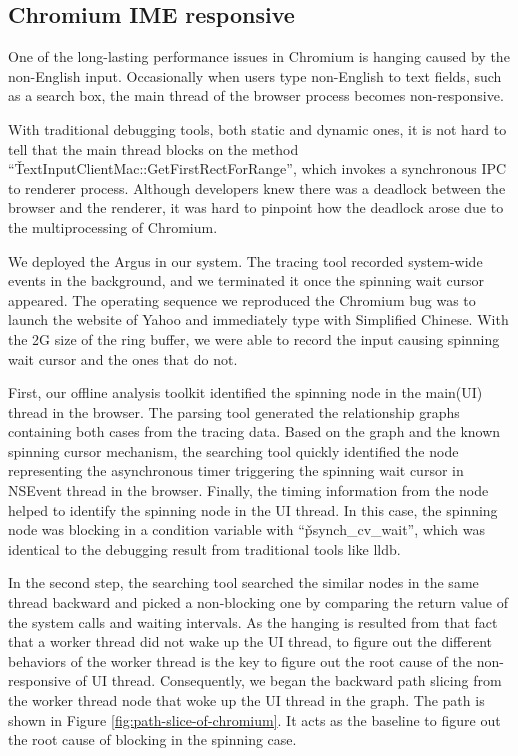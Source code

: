 \subsection{Chromium IME responsive}
One of the long-lasting performance issues in Chromium is hanging caused by the non-English input.
Occasionally when users type non-English to text fields, such as a search box, the main thread of the browser process becomes non-responsive.
 
With traditional debugging tools, both static and dynamic ones, it is not hard to tell that the main thread blocks on the method ``\v{TextInputClientMac::GetFirstRectForRange}'', which invokes a synchronous IPC to renderer process.
Although developers knew there was a deadlock between the browser and the renderer,
it was hard to pinpoint how the deadlock arose due to the multiprocessing of Chromium.

We deployed the Argus in our system. 
The tracing tool recorded system-wide events in the background, and we terminated it once the spinning wait cursor appeared.
The operating sequence we reproduced the Chromium bug was to launch the website of Yahoo and immediately type with Simplified Chinese.
With the 2G size of the ring buffer, we were able to record the input causing spinning wait cursor and the ones that do not.

First, our offline analysis toolkit identified the spinning node in the main(UI) thread in the browser.
The parsing tool generated the relationship graphs containing both cases from the tracing data.
Based on the graph and the known spinning cursor mechanism, the searching tool quickly identified the node representing the asynchronous timer triggering the spinning wait cursor in NSEvent thread in the browser.
Finally, the timing information from the node helped to identify the spinning node in the UI thread.
In this case, the spinning node was blocking in a condition variable with ``\v{psynch\_cv\_wait}'', which was identical to the debugging result from traditional tools like lldb.

In the second step, the searching tool searched the similar nodes in the same thread backward and picked a non-blocking one by comparing the return value of the system calls and waiting intervals.
As the hanging is resulted from that fact that a worker thread did not wake up the UI thread, to figure out the different behaviors of the worker thread is the key to figure out the root cause of the non-responsive of UI thread.
Consequently, we began the backward path slicing from the worker thread node that woke up the UI thread in the graph.
The path is shown in Figure \ref{fig:path-slice-of-chromium}.
It acts as the baseline to figure out the root cause of blocking in the spinning case.

